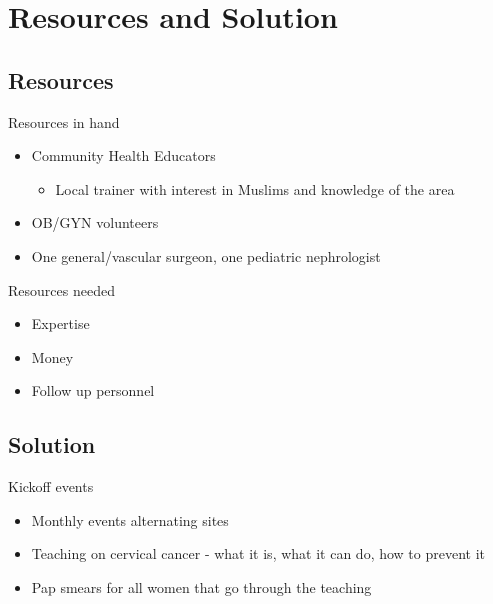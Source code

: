\section{Resources and Solution}\label{resources-and-solution}

\subsection{Resources}\label{resources}

\begin{frame}{Resources in hand}

\begin{itemize}
\itemsep1pt\parskip0pt
\item
  Community Health Educators

  \begin{itemize}
  \itemsep1pt\parskip0pt
  \item
    Local trainer with interest in Muslims and knowledge of the area
  \end{itemize}
\item
  OB/GYN volunteers
\item
  One general/vascular surgeon, one pediatric nephrologist
\end{itemize}

\end{frame}

\begin{frame}{Resources needed}

\begin{itemize}
\itemsep1pt\parskip0pt
\item
  Expertise
\item
  Money
\item
  Follow up personnel
\end{itemize}

\end{frame}

\subsection{Solution}\label{solution}

\begin{frame}{Kickoff events}

\begin{itemize}
\itemsep1pt\parskip0pt
\item
  Monthly events alternating sites
\item
  Teaching on cervical cancer - what it is, what it can do, how to
  prevent it
\item
  Pap smears for all women that go through the teaching
\end{itemize}

\end{frame}

